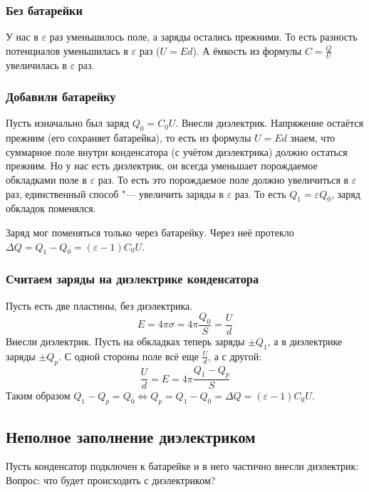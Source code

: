     \subsubsection{Без батарейки}
      У нас в $\varepsilon$ раз уменьшилось поле, а заряды остались прежними.
      То есть разность потенциалов уменьшилась в $\varepsilon$ раз ($U=Ed$).
      А ёмкость из формулы $C=\frac{Q}{U}$ увеличилась в $\varepsilon$ раз.

    \subsubsection{Добавили батарейку}
      Пусть изначально был заряд $Q_0=C_0U$.
      Внесли диэлектрик.
      Напряжение остаётся прежним (его сохраняет батарейка), то есть из формулы $U=Ed$ знаем, что суммарное
      поле внутри конденсатора (с учётом диэлектрика) должно остаться прежним.
      Но у нас есть диэлектрик, он всегда уменьшает порождаемое обкладками поле в $\varepsilon$ раз.
      То есть это порождаемое поле должно увеличиться в $\varepsilon$ раз,
      единственный способ "--- увеличить заряды в $\varepsilon$ раз.
      То есть $Q_1=\varepsilon Q_0$, заряд обкладок поменялся.
      \begin{Rem}
        Заряд мог поменяться только через батарейку.
        Через неё протекло $\Delta Q = Q_1 - Q_0 = (\varepsilon - 1)C_0U$.
      \end{Rem}

    \subsubsection{Считаем заряды на диэлектрике конденсатора}
      Пусть есть две пластины, без диэлектрика.
      \[ E = 4\pi \sigma = 4\pi \frac{Q_0}S = \frac U d\]
      Внесли диэлектрик.
      Пусть на обкладках теперь заряды $\pm Q_1$, а в диэлектрике заряды $\pm Q_p$.
      С одной стороны поле всё еще $\frac U d$, а с другой:
      \[ \frac U d = E = 4\pi \frac{Q_1-Q_p}{S}\]
      Таким образом $Q_1-Q_p=Q_0 \iff Q_p=Q_1-Q_0=\Delta Q = (\varepsilon-1)C_0U$.

  \subsection{Неполное заполнение диэлектриком}
    Пусть конденсатор подключен к батарейке и в него частично внесли диэлектрик:
    Вопрос: что будет происходить с диэлектриком?

